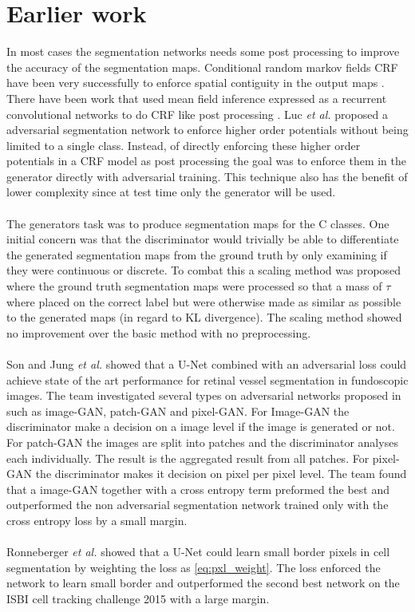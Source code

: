 \documentclass{kththesis}
\begin{document}
\section{Earlier work}
In most cases the segmentation networks needs some post processing to improve the accuracy of the segmentation maps. Conditional random markov fields CRF have been very successfully to enforce spatial contiguity in the output maps \parencite{arnab_higher_2015, luc_semantic_2016}. There have been work that used mean field inference expressed as a recurrent convolutional networks to do CRF like post processing \parencite{schwing_fully_2015, zheng_conditional_2015}. Luc \textit{et al.} \parencite{luc_semantic_2016} proposed a adversarial segmentation network to enforce higher order potentials without being limited to a single class. Instead, of directly enforcing these higher order potentials in a CRF model as post processing the goal was to enforce them in the generator directly with adversarial training. This technique also has the benefit of lower complexity since at test time only the generator will be used.\\
\\
The generators task was to produce segmentation maps for the C classes. One initial concern was that the discriminator would trivially be able to differentiate the generated segmentation maps from the ground truth by only examining if they were continuous or discrete. To combat this a scaling method was proposed where the ground truth segmentation maps were processed so that a mass of $\tau$ where placed on the correct label but were otherwise made as similar as possible to the generated maps (in regard to KL divergence). The scaling method showed no improvement over the basic method with no preprocessing.\\
\\
Son and Jung \textit{et al.} \parencite{son_retinal_2017} showed that a U-Net combined with an adversarial loss could achieve state of the art performance for retinal vessel segmentation in fundoscopic images. The team investigated several types on adversarial networks proposed in \parencite{isola_image--image_2016} such as image-GAN, patch-GAN and pixel-GAN. For Image-GAN the discriminator make a decision on a image level if the image is generated or not. For patch-GAN the images are split into patches and the discriminator analyses each individually. The result is the aggregated result from all patches. For pixel-GAN the discriminator makes it decision on pixel per pixel level. The team found that a image-GAN together with a cross entropy term preformed the best and outperformed the non adversarial segmentation network trained only with the cross entropy loss by a small margin.\\
\\
Ronneberger \textit{et al.} \parencite{ronneberger_u-net:_2015} showed that a U-Net could learn small border pixels in cell segmentation by weighting the loss as \ref{eq:pxl_weight}. The loss enforced the network to learn small border and outperformed the second best network on the ISBI cell tracking challenge 2015 with a large margin.
\end{document}
